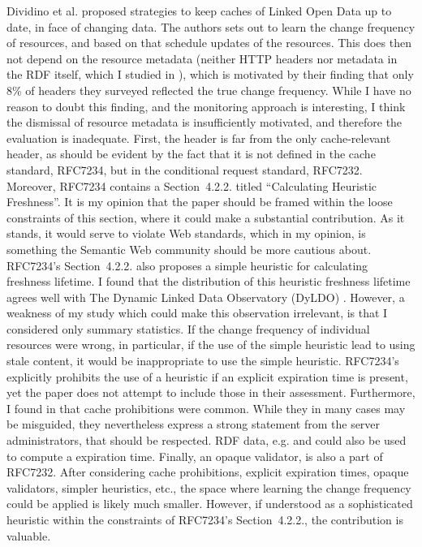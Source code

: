 Dividino et al. \cite{Dividino2015} proposed strategies to keep caches
of Linked Open Data up to date, in face of changing data. The authors
sets out to learn the change frequency of resources, and based on that
schedule updates of the resources. This does then not depend on the
resource metadata (neither HTTP headers nor metadata in the RDF
itself, which I studied in \cite{kjernsmo_survey_2015}), which is
motivated by their finding that only 8\% of 
headers they surveyed reflected the true change frequency. While I
have no reason to doubt this finding, and the monitoring approach is
interesting, I think the dismissal of resource metadata is
insufficiently motivated, and therefore the evaluation is
inadequate. First, the  header is far from the
only cache-relevant header, as should be evident by the fact that it
is not defined in the cache standard, RFC7234, but in the conditional
request standard, RFC7232. Moreover, RFC7234 contains a Section~4.2.2.
titled ``Calculating Heuristic Freshness''. It is my opinion that the
paper should be framed within the loose constraints of this section,
where it could make a substantial contribution. As it stands, it would
serve to violate Web standards, which in my opinion, is something the
Semantic Web community should be more cautious about. RFC7234's
Section~4.2.2. also proposes a simple heuristic for calculating
freshness lifetime. I found that the distribution of this heuristic
freshness lifetime agrees well with The Dynamic Linked Data
Observatory (DyLDO) \cite{dyldo2}. However, a weakness of my study
which could make this observation irrelevant, is that I considered
only summary statistics. If the change frequency of individual
resources were wrong, in particular, if the use of the simple
heuristic lead to using stale content, it would be inappropriate to
use the simple heuristic.  RFC7234's explicitly prohibits the use of a
heuristic if an explicit expiration time is present, yet the paper
does not attempt to include those in their assessment. Furthermore, I
found in \cite{kjernsmo_survey_2015} that cache prohibitions were
common. While they in many cases may be misguided, they nevertheless
express a strong statement from the server administrators, that should
be respected. RDF data, e.g.  and
 could also be used to compute a expiration
time. Finally, an opaque validator,  is also a part of
RFC7232. After considering cache prohibitions, explicit expiration
times, opaque validators, simpler heuristics, etc., the space where
learning the change frequency could be applied is likely much
smaller. However, if understood as a sophisticated heuristic within
the constraints of RFC7234's Section~4.2.2., the contribution is
valuable.

